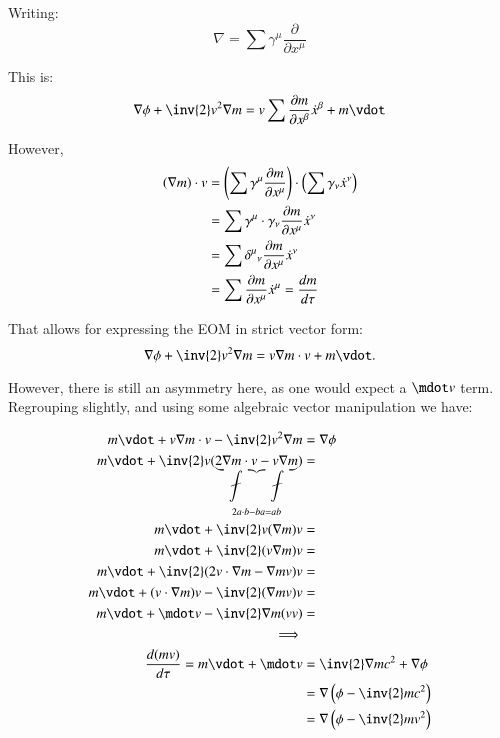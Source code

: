 Writing:
\begin{equation*}
\nabla = \sum \gamma^{\mu} \frac{\partial}{\partial x^{\mu}}
\end{equation*}

This is:
\begin{equation*}
\grad \phi + \inv{2} v^2 \grad m = v \sum \PD{x^{\beta}}{m} \xdot^{\beta} + m \vdot 
\end{equation*}

However, 
\begin{align*}
(\grad m) \cdot v 
&= 
\left(\sum \gamma^{\mu} \PD{x^{\mu}}{m}\right) \cdot \left( \sum \gamma_{\nu} \xdot^{\nu} \right) \\
&= \sum \gamma^{\mu} \cdot \gamma_{\nu} \PD{x^{\mu}}{m} \xdot^{\nu} \\
&= \sum {\delta^{\mu}}_{\nu} \PD{x^{\mu}}{m} \xdot^{\nu} \\
&= \sum \PD{x^{\mu}}{m} \xdot^{\mu} = \frac{dm}{d\tau}
\end{align*}

That allows for expressing the EOM in strict vector form:
\begin{equation}
\grad \phi + \inv{2} v^2 \grad m = v \grad m \cdot v + m \vdot.
\end{equation}

However, there is still an asymmetry here, as one would expect a $\mdot v$ term.  Regrouping slightly, and using some algebraic vector
manipulation we have:

\begin{align*}
m \vdot + v \grad m \cdot v - \inv{2} v^2 \grad m &= \grad \phi \\
m \vdot + \inv{2} v ( \underbrace{2 \grad m \cdot v - v \grad m}_{2 a \cdot b - b a = a b}) &= \\
m \vdot + \inv{2} v (\grad m) v &= \\
m \vdot + \inv{2} (v \grad m) v &= \\
m \vdot + \inv{2} (2 v \cdot \grad m - \grad m v) v &= \\
m \vdot + (v \cdot \grad m) v - \inv{2} (\grad m v) v &= \\
m \vdot + \mdot v - \inv{2} \grad m (v v) &= \\
\implies \\
\frac{d (m v)}{d\tau} = m \vdot + \mdot v
&= \inv{2} \grad m c^2 +\grad \phi \\
&= \grad \left(\phi - \inv{2} m c^2 \right) \\
&= \grad \left(\phi - \inv{2} m v^2 \right) \\
\end{align*}

